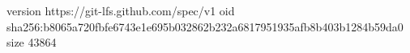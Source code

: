 version https://git-lfs.github.com/spec/v1
oid sha256:b8065a720fbfe6743e1e695b032862b232a6817951935afb8b403b1284b59da0
size 43864
